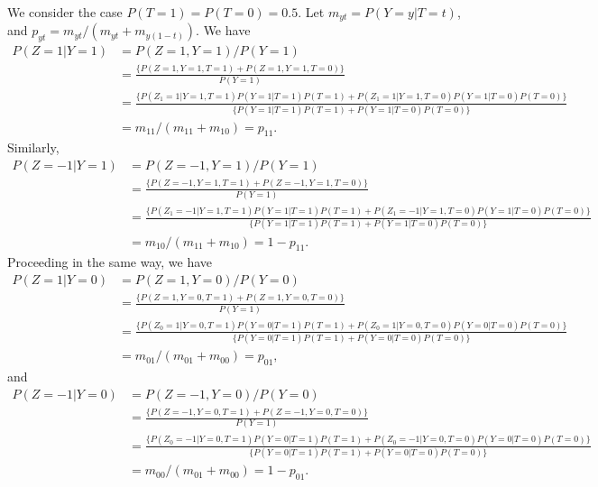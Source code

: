 \documentclass[10pt]{article}
\begin{document}
We consider the case $P(T=1)=P(T=0) = 0.5$.
Let $m_{yt} = P( Y=y | T=t)$, and $p_{yt} = m_{yt} / ( m_{yt} + m_{y(1-t)})$.
We have
\begin{align*}
  P( Z = 1 | Y=1 )  & = P( Z =1 , Y=1 ) / P(Y = 1)  \\
   & = \tfrac{\biggl\{P( Z=1, Y=1, T=1 ) + P(Z=1, Y=1, T=0)\biggr\}}{ P(Y=1)} \\
  & = \tfrac{\biggl\{P(Z_1=1 | Y=1, T=1)P(Y=1 | T=1) P(T=1)  + P(Z_1=1 | Y=1, T=0)P(Y=1 | T=0) P(T=0) \biggr\}}
  {\biggl\{ P(Y=1|T=1)P(T=1) + P(Y=1 | T=0) P(T=0) \biggr\} } \\
   & = m_{11} / ( m_{11} + m_{10}) = p_{11}.
\end{align*}
Similarly,
\begin{align*}
  P( Z = -1 | Y=1 ) & = P( Z =-1 , Y=1 ) / P(Y = 1) \\
  & = \tfrac{\biggl\{P( Z=-1, Y=1, T=1 ) + P(Z=-1, Y=1, T=0)\biggr\}}{ P(Y=1)} \\
  & = \tfrac{\biggl\{P(Z_1=-1 | Y=1, T=1)P(Y=1 | T=1) P(T=1) + P(Z_1=-1 | Y=1, T=0)P(Y=1 | T=0) P(T=0) \biggr\}}
  {\biggl\{ P(Y=1|T=1)P(T=1) + P(Y=1 | T=0) P(T=0) \biggr\}} \\
  & = m_{10} / ( m_{11} + m_{10}) = 1 - p_{11}.
\end{align*}
Proceeding in the same way, we have
\begin{align*}
  P( Z = 1 | Y=0 ) & = P( Z =1 , Y=0 ) / P(Y = 0)  \\
  & = \tfrac{\biggl\{P( Z=1, Y=0, T=1 ) + P(Z=1, Y=0, T=0)\biggr\} }{ P(Y=1)} \\
  & = \tfrac{\biggl\{P(Z_0=1 | Y=0, T=1)P(Y=0 | T=1) P(T=1) + P(Z_0=1 | Y=0, T=0)P(Y=0 | T=0) P(T=0) \biggr\}}
  {\biggl\{ P(Y=0|T=1)P(T=1) + P(Y=0 | T=0) P(T=0) \biggr\}} \\
  & = m_{01} / ( m_{01} + m_{00}) = p_{01},
\end{align*}
and
\begin{align*}
  P( Z = -1 | Y=0 ) & = P( Z =-1 , Y=0 ) / P(Y = 0)  \\
  & = \tfrac{\biggl\{P( Z=-1, Y=0, T=1 ) + P(Z=-1, Y=0, T=0)\biggr\}}{ P(Y=1)} \\
  & = \tfrac{\biggl\{P(Z_0=-1 | Y=0, T=1)P(Y=0 | T=1) P(T=1) + P(Z_0=-1 | Y=0, T=0)P(Y=0 | T=0) P(T=0) \biggr\} }
  {\biggl\{ P(Y=0|T=1)P(T=1) + P(Y=0 | T=0) P(T=0) \biggr\} }\\
  & = m_{00} / ( m_{01} + m_{00}) = 1 - p_{01}.
\end{align*}
\end{document}
